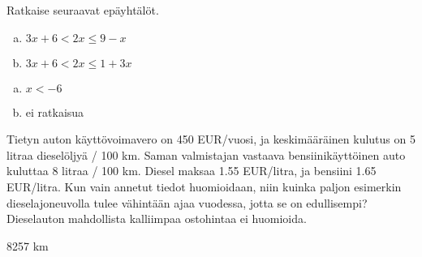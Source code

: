 \begin{tehtava}
    Ratkaise seuraavat epäyhtälöt.
    \begin{enumerate}[a)]
        \item $3x+6<2x\leq 9-x$
        \item $3x+6<2x\leq 1+3x$
    \end{enumerate}
    \begin{vastaus}
        \begin{enumerate}[a)]
            \item $x<-6$
            \item ei ratkaisua
        \end{enumerate}
    \end{vastaus}
\end{tehtava}

\begin{tehtava}
    \item Tietyn auton käyttövoimavero on 450 EUR/vuosi, ja keskimääräinen kulutus on 5 litraa dieselöljyä / 100 km. Saman valmistajan vastaava bensiinikäyttöinen auto kuluttaa 8 litraa / 100 km. Diesel maksaa 1.55 EUR/litra, ja bensiini 1.65 EUR/litra. Kun vain annetut tiedot huomioidaan, niin kuinka paljon esimerkin dieselajoneuvolla tulee vähintään ajaa vuodessa, jotta se on edullisempi? Dieselauton mahdollista kalliimpaa ostohintaa ei huomioida.
    \begin{vastaus}
        \item 8257 km
    \end{vastaus}
\end{tehtava}
